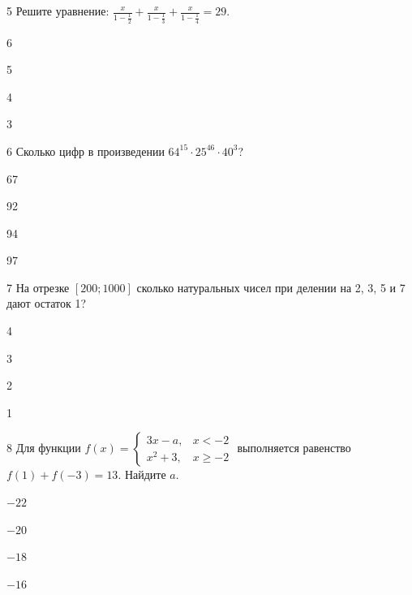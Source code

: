 \documentclass[14pt]{article}
\begin{document}
\begin{questionbox}{5}
    Решите уравнение: \(\frac{x}{1-\frac{1}{2}} + \frac{x}{1-\frac{1}{3}} + \frac{x}{1-\frac{1}{4}} = 29\).
    \begin{options}
        \item 6
        \item 5
        \item 4
        \item 3
    \end{options}
\end{questionbox}



\begin{questionbox}{6}
    Сколько цифр в произведении \(64^{15} \cdot 25^{46} \cdot 40^{3}\)?
    \begin{options}
        \item 67
        \item 92
        \item 94
        \item 97
    \end{options}
\end{questionbox}



\begin{questionbox}{7}
    На отрезке \([200; 1000]\) сколько натуральных чисел при делении на 2, 3, 5 и 7 дают остаток 1?
    \begin{options}
        \item 4
        \item 3
        \item 2
        \item 1
    \end{options}
\end{questionbox}



\begin{questionbox}{8}
    Для функции \(f(x) = \begin{cases} 3x - a, & x < -2 \\ x^2 + 3, & x \geq -2 \end{cases}\) выполняется равенство \(f(1) + f(-3) = 13\). Найдите \(a\).
    \begin{options}
        \item \(-22\)
        \item \(-20\)
        \item \(-18\)
        \item \(-16\)
    \end{options}
\end{questionbox}
\end{document}
